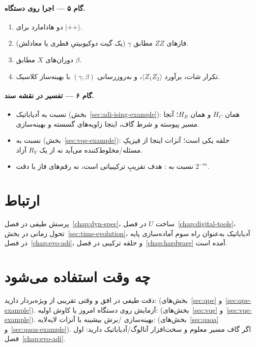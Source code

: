 \paragraph{گام ۵ --- اجرا روی دستگاه.}
\begin{enumerate}
	\item دو هادامارد برای $\lvert++\rangle$.
	\item فازهای $ZZ$ مطابق $\gamma$ (یک گیت دوکیوبیتیِ قطری یا معادلش).
	\item دوران‌های $X$ مطابق $\beta$.
	\item تکرار شات، برآورد $\langle Z_1Z_2\rangle$، و به‌روزرسانی $(\gamma,\beta)$ با بهینه‌ساز کلاسیک.
\end{enumerate}

\paragraph{گام ۶ --- تفسیر در نقشه سند.}
\begin{itemize}
	\item نسبت به آدیاباتیک (بخش~\ref{sec:adi-ising-example}): همان $H_C$ و همان $H_B$؛ آنجا مسیر پیوسته و شرط گاف، اینجا زاویه‌های گسسته و بهینه‌سازی.
	\item نسبت به  (بخش~\ref{sec:vqe-example}): حلقه یکی است؛ آنزات اینجا از فیزیکِ مسئله/مخلوط‌کننده می‌آید نه از یک $R_Y$ آزاد.
	\item نسبت به : هدف تقریبِ ترکیبیاتی است، نه رقم‌های فاز با دقت $2^{-m}$.
\end{itemize}

\section{ارتباط}

پرسش طیفی در فصل~\ref{chap:dyn-spec}، ساخت $U$ در فصل~\ref{chap:digital-tools}، تحول زمانی در بخش~\ref{sec:time-evolution}، آدیاباتیک به‌عنوان راه سوم آماده‌سازی پایه در فصل~\ref{chap:evo-adi}، و حلقه ترکیبی در فصل~\ref{chap:hardware} آمده است.

\section{چه وقت استفاده می‌شود}

دقت طیفی در افق  و وقتی تقریبی از ویژه‌بردار دارید:  (بخش‌های~\ref{sec:qpe} و~\ref{sec:qpe-example}). آزمایش روی دستگاه امروز یا کاوش اولیه:  (بخش‌های~\ref{sec:vqe} و~\ref{sec:vqe-example}). بهینه‌سازی /برش بیشینه با آنزات لایه‌لایه:  (بخش‌های~\ref{sec:qaoa} و~\ref{sec:qaoa-example}). اگر گاف مسیر معلوم و سخت‌افزار آنالوگ/آدیاباتیک دارید: اول فصل~\ref{chap:evo-adi}.


